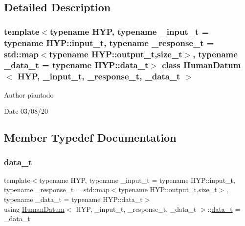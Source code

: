 \subsection{Detailed Description}
\subsubsection*{template$<$typename H\+YP, typename \+\_\+input\+\_\+t = typename H\+Y\+P\+::input\+\_\+t, typename \+\_\+response\+\_\+t = std\+::map$<$typename H\+Y\+P\+::output\+\_\+t,size\+\_\+t$>$, typename \+\_\+data\+\_\+t = typename H\+Y\+P\+::data\+\_\+t$>$\newline
class Human\+Datum$<$ H\+Y\+P, \+\_\+input\+\_\+t, \+\_\+response\+\_\+t, \+\_\+data\+\_\+t $>$}

\begin{DoxyAuthor}{Author}
piantado 
\end{DoxyAuthor}
\begin{DoxyDate}{Date}
03/08/20 
\end{DoxyDate}


\subsection{Member Typedef Documentation}
\mbox{\label{struct_human_datum_ab199049ab924515f05cf207d380bb851}} 
\subsubsection{\texorpdfstring{data\+\_\+t}{data\_t}}
{\footnotesize\ttfamily template$<$typename H\+YP, typename \+\_\+input\+\_\+t = typename H\+Y\+P\+::input\+\_\+t, typename \+\_\+response\+\_\+t = std\+::map$<$typename H\+Y\+P\+::output\+\_\+t,size\+\_\+t$>$, typename \+\_\+data\+\_\+t = typename H\+Y\+P\+::data\+\_\+t$>$ \\
using \hyperlink{struct_human_datum}{Human\+Datum}$<$ H\+YP, \+\_\+input\+\_\+t, \+\_\+response\+\_\+t, \+\_\+data\+\_\+t $>$\+::\hyperlink{struct_human_datum_ab199049ab924515f05cf207d380bb851}{data\+\_\+t} =  \+\_\+data\+\_\+t}

\mbox{\label{struct_human_datum_a8229662f54f4b18d33b0d068d23b03b0}} 
